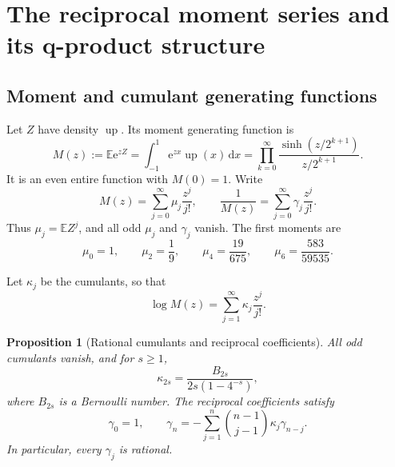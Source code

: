 \documentclass[11pt,a4paper]{article}
\newtheorem{proposition}[theorem]{Proposition}
\theoremstyle{remark}
\newcommand{\e}{\mathrm{e}}
\newcommand{\dd}{\,\mathrm{d}}
\newcommand{\up}{\operatorname{up}}
\begin{document}
\section{The reciprocal moment series and its q-product structure}
\label{sec:reciprocal-moments}

\subsection{Moment and cumulant generating functions}

Let $Z$ have density $\up$.  Its moment generating function is
\begin{equation}
 M(z):=\mathbb E\e^{zZ}
 =\int_{-1}^{1}\e^{zx}\up(x)\dd x
 =\prod_{k=0}^{\infty}
 \frac{\sinh(z/2^{k+1})}{z/2^{k+1}}.
 \label{eq:mgf}
\end{equation}
It is an even entire function with $M(0)=1$.  Write
\begin{equation}
 M(z)=\sum_{j=0}^{\infty}\mu_j\frac{z^j}{j!},
 \qquad
 \frac1{M(z)}=\sum_{j=0}^{\infty}\gamma_j\frac{z^j}{j!}.
 \label{eq:mu-gamma}
\end{equation}
Thus $\mu_j=\mathbb E Z^j$, and all odd $\mu_j$ and $\gamma_j$ vanish.
The first moments are
\begin{equation}
 \mu_0=1,\qquad \mu_2=\frac19,\qquad
 \mu_4=\frac{19}{675},\qquad
 \mu_6=\frac{583}{59535}.
 \label{eq:first-moments}
\end{equation}

Let $\kappa_j$ be the cumulants, so that
\begin{equation}
 \log M(z)=\sum_{j=1}^{\infty}\kappa_j\frac{z^j}{j!}.
 \label{eq:cumulants-def}
\end{equation}

\begin{proposition}[Rational cumulants and reciprocal coefficients]
\label{prop:cumulants}
All odd cumulants vanish, and for $s\ge1$,
\begin{equation}
 \boxed{
 \kappa_{2s}=\frac{B_{2s}}{2s(1-4^{-s})}, }
 \label{eq:cumulant-formula}
\end{equation}
where $B_{2s}$ is a Bernoulli number.  The reciprocal coefficients satisfy
\begin{equation}
 \gamma_0=1,
 \qquad
 \gamma_n=-\sum_{j=1}^{n}\binom{n-1}{j-1}
 \kappa_j\gamma_{n-j}.
 \label{eq:gamma-recurrence}
\end{equation}
In particular, every $\gamma_j$ is rational.
\end{proposition}
\end{document}
